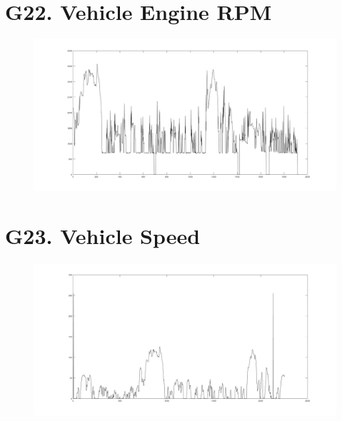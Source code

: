 \documentclass{article}
\begin{document}
\section*{G22. Vehicle Engine RPM }
\begin{figure}[h!]
 \begin{center}
 \advance\leftskip-6cm
  \includegraphics[width=230mm,scale=0.7]{g22s1.jpg}
\end{center}
\end{figure}
\newpage
\section*{G23. Vehicle Speed }
\begin{figure}[h!]
 \begin{center}
 \advance\leftskip-6cm
  \includegraphics[width=230mm,scale=0.7]{g23s1.jpg}
\end{center}
\end{figure}
\newpage
\end{document}
